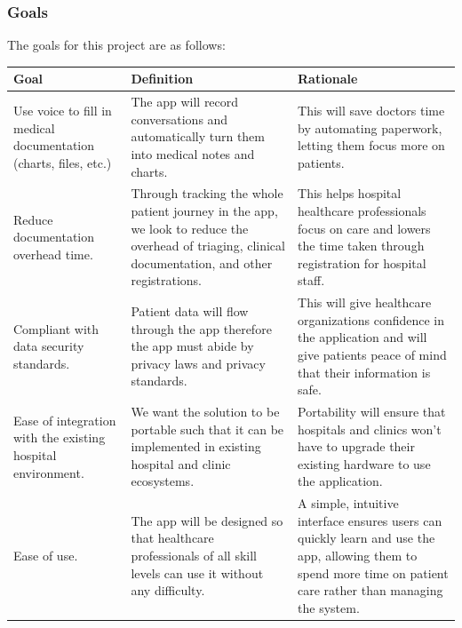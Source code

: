 \documentclass[12pt]{article}
\newcounter{goalnum} %
\begin{document}
\subsubsection{Goals} \label{sec_Goals}
The goals for this project are as follows:
\begin{table}[H]
    \centering
    \begin{tabular}{p{4cm} p{4cm} p{4cm}}
        \toprule
        \textbf{Goal} & \textbf{Definition} & \textbf{Rationale} \\
        \midrule
        [G\refstepcounter{goalnum}\thegoalnum \label{G_VoiceToDocumentation}:] Use voice to fill in medical documentation (charts, files, etc.) & The app will record conversations and automatically turn them into medical notes and charts. & This will save doctors time by automating paperwork, letting them focus more on patients. \\
        \midrule
        [G\refstepcounter{goalnum}\thegoalnum \label{G_reduceOverhead}:] Reduce documentation overhead time.  & Through tracking the whole patient journey in the app, we look to reduce the overhead of triaging, clinical documentation, and other registrations.  & This helps hospital healthcare professionals focus on care and lowers the time taken through registration for hospital staff. \\ 
        \midrule
        [G\refstepcounter{goalnum}\thegoalnum \label{G_security}:] Compliant with data security standards.  & Patient data will flow through the app therefore the app must abide by privacy laws and privacy standards. & This will give healthcare organizations confidence in the application and will give patients peace of mind that their information is safe. \\
        \midrule 
        [G\refstepcounter{goalnum}\thegoalnum \label{G_integration}:] Ease of integration with the existing hospital environment. & We want the solution to be portable such that it can be implemented in existing hospital and clinic ecosystems.  & Portability will ensure that hospitals and clinics won’t have to upgrade their existing hardware to use the application. \\
        \midrule 
        [G\refstepcounter{goalnum}\thegoalnum \label{G_easeOfUse}:] Ease of use. & The app will be designed so that healthcare professionals of all skill levels can use it without any difficulty. & A simple, intuitive interface ensures users can quickly learn and use the app, allowing them to spend more time on patient care rather than managing the system. \\
        \bottomrule
    \end{tabular}
\end{table}
\end{document}
